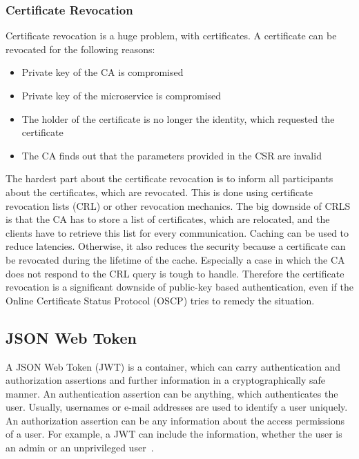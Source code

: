 \subsubsection{Certificate Revocation}
Certificate revocation is a huge problem, with certificates.
A certificate can be revocated for the following reasons: 
\begin{itemize}
    \item Private key of the CA is compromised
    \item Private key of the microservice is compromised
    \item The holder of the certificate is no longer the identity, which requested the certificate 
    \item The CA finds out that the parameters provided in the CSR are invalid
\end{itemize}
The hardest part about the certificate revocation is to inform all participants about the certificates, which are revocated.
This is done using certificate revocation lists (CRL) or other revocation mechanics.
The big downside of CRLS is that the CA has to store a list of certificates, which are relocated, and the clients have to retrieve this list for every communication.
Caching can be used to reduce latencies.
Otherwise, it also reduces the security because a certificate can be revocated during the lifetime of the cache.
Especially a case in which the CA does not respond to the CRL query is tough to handle.
Therefore the certificate revocation is a significant downside of public-key based authentication, even if the Online Certificate Status Protocol (OSCP) tries to remedy the situation\cite{dias2020microservices}.

\subsection{JSON Web Token}
A JSON Web Token (JWT) is a container, which can carry authentication and authorization assertions and further information in a cryptographically safe manner.
An authentication assertion can be anything, which authenticates the user.
Usually, usernames or e-mail addresses are used to identify a user uniquely.
An authorization assertion can be any information about the access permissions of a user.
For example, a JWT can include the information, whether the user is an admin or an unprivileged user~\cite{dias2020microservices}. 

